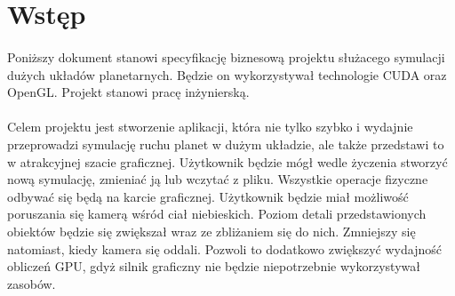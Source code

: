 \section{Wstęp}\label{sec:wstep}
	
\paragraph{}

Poniższy dokument stanowi specyfikację biznesową projektu służacego symulacji dużych układów planetarnych. Będzie on wykorzystywał technologie CUDA oraz OpenGL. Projekt stanowi pracę inżynierską.

\paragraph{}

Celem projektu jest stworzenie aplikacji, która nie tylko szybko i wydajnie przeprowadzi symulację ruchu planet w dużym układzie, ale także przedstawi to w atrakcyjnej szacie graficznej. Użytkownik będzie mógł wedle życzenia stworzyć nową symulację, zmieniać ją lub wczytać z pliku.
Wszystkie operacje fizyczne odbywać się będą na karcie graficznej. Użytkownik będzie miał możliwość poruszania się kamerą wśród ciał niebieskich. Poziom detali przedstawionych obiektów będzie się zwiększał wraz ze zbliżaniem się do nich. Zmniejszy się natomiast, kiedy kamera się oddali. Pozwoli to dodatkowo zwiększyć wydajność obliczeń GPU, gdyż silnik graficzny nie będzie niepotrzebnie wykorzystywał zasobów.
